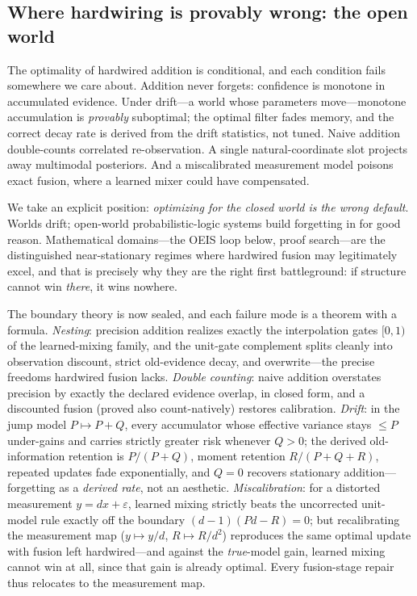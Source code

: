 \documentclass[11pt]{article}
\begin{document}
\subsection{Where hardwiring is provably wrong: the open world}
\label{sec:openworld}

The optimality of hardwired addition is conditional, and each condition fails somewhere
we care about. Addition never forgets: confidence is monotone in accumulated evidence.
Under drift---a world whose parameters move---monotone accumulation is \emph{provably}
suboptimal; the optimal filter fades memory, and the correct decay rate is derived from
the drift statistics, not tuned. Naive addition double-counts correlated re-observation.
A single natural-coordinate slot projects away multimodal posteriors. And a
miscalibrated measurement model poisons exact fusion, where a learned mixer could have
compensated.

We take an explicit position: \emph{optimizing for the closed world is the wrong
default}. Worlds drift; open-world probabilistic-logic systems build forgetting in for
good reason. Mathematical domains---the OEIS loop below, proof search---are the
distinguished near-stationary regimes where hardwired fusion may legitimately excel,
and that is precisely why they are the right first battleground: if structure cannot
win \emph{there}, it wins nowhere.

The boundary theory is now sealed, and each failure mode is a theorem with a formula.
\emph{Nesting}: precision addition realizes exactly the interpolation gates $[0,1)$ of
the learned-mixing family, and the unit-gate complement splits cleanly into observation
discount, strict old-evidence decay, and overwrite---the precise freedoms hardwired
fusion lacks. \emph{Double counting}: naive addition overstates precision by exactly
the declared evidence overlap, in closed form, and a discounted fusion (proved also
count-natively) restores calibration. \emph{Drift}: in the jump model
$P\mapsto P+Q$, every accumulator whose effective variance stays $\le P$ under-gains and
carries strictly greater risk whenever $Q>0$; the derived old-information retention is
$P/(P+Q)$, moment retention $R/(P+Q+R)$, repeated updates fade exponentially, and
$Q=0$ recovers stationary addition---forgetting as a \emph{derived rate}, not an
aesthetic. \emph{Miscalibration}: for a distorted measurement $y=dx+\varepsilon$,
learned mixing strictly beats the uncorrected unit-model rule exactly off the boundary
$(d-1)(Pd-R)=0$; but recalibrating the measurement map ($y\mapsto y/d$,
$R\mapsto R/d^{2}$) reproduces the same optimal update with fusion left hardwired---and
against the \emph{true}-model gain, learned mixing cannot win at all, since that gain
is already optimal. Every fusion-stage repair thus relocates to the measurement map.
\end{document}
